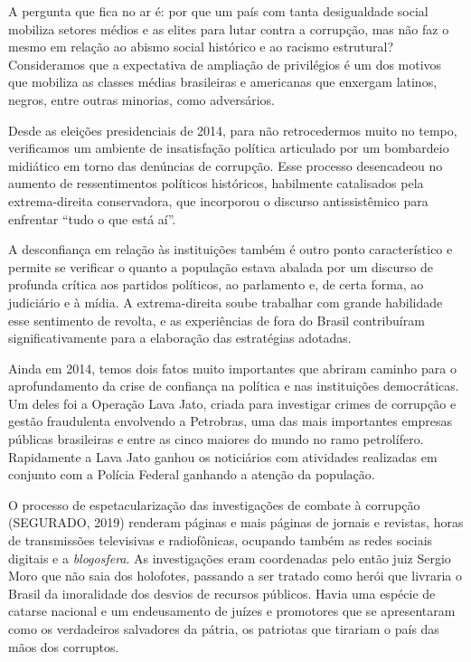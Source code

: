 A pergunta que fica no ar é: por que um país com tanta desigualdade
social mobiliza setores médios e as elites para lutar contra a
corrupção, mas não faz o mesmo em relação ao abismo social histórico e
ao racismo estrutural? Consideramos que a expectativa de ampliação de
privilégios é um dos motivos que mobiliza as classes médias brasileiras
e americanas que enxergam latinos, negros, entre outras minorias, como
adversários.

Desde as eleições presidenciais de 2014, para não retrocedermos muito no
tempo, verificamos um ambiente de insatisfação política articulado por
um bombardeio midiático em torno das denúncias de corrupção. Esse
processo desencadeou no aumento de ressentimentos políticos históricos,
habilmente catalisados pela extrema-direita conservadora, que incorporou
o discurso antissistêmico para enfrentar ``tudo o que está aí''.

A desconfiança em relação às instituições também é outro ponto
característico e permite se verificar o quanto a população estava abalada por um
discurso de profunda crítica aos partidos políticos, ao parlamento e, de
certa forma, ao judiciário e à mídia. A extrema-direita soube trabalhar
com grande habilidade esse sentimento de revolta, e as experiências de
fora do Brasil contribuíram significativamente para a elaboração das
estratégias adotadas.

Ainda em 2014, temos dois fatos muito importantes que abriram caminho
para o aprofundamento da crise de confiança na política e nas
instituições democráticas. Um deles foi a Operação Lava Jato, criada
para investigar crimes de corrupção e gestão fraudulenta envolvendo a
Petrobras, uma das mais importantes empresas públicas brasileiras e
entre as cinco maiores do mundo no ramo petrolífero. Rapidamente a Lava
Jato ganhou os noticiários com atividades realizadas em conjunto com a
Polícia Federal ganhando a atenção da população.

O processo de espetacularização das investigações de combate à corrupção
(SEGURADO, 2019) renderam páginas e mais páginas de jornais e revistas,
horas de transmissões televisivas e radiofônicas, ocupando também as
redes sociais digitais e a \textit{blogosfera}. As investigações eram coordenadas
pelo então juiz Sergio Moro que não saia dos holofotes, passando a ser
tratado como herói que livraria o Brasil da imoralidade dos desvios de
recursos públicos. Havia uma espécie de catarse nacional e um
endeusamento de juízes e promotores que se apresentaram como os
verdadeiros salvadores da pátria, os patriotas que tirariam o país das
mãos dos corruptos.


